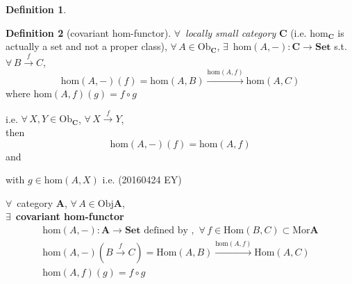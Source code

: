 \documentclass[twoside,landscape,10pt]{amsart}
\theoremstyle{plain}
\theoremstyle{definition}
\newtheorem{definition}{Definition}
\theoremstyle{remark}
\begin{document}
\begin{multicols*}{2}
\begin{definition}


\end{definition}


\begin{definition}[covariant hom-functor]
$\forall \, $ \emph{locally small category} $\mathbf{C}$ (i.e. $\text{hom}_{\mathbf{C}}$ is actually a set and not a proper class), $\forall \, A \in \text{Ob}_{\mathbf{C}}$, $\exists \, $  $\text{hom}(A, - ) : \mathbf{C} \to \mathbf{\text{Set}}$ s.t. $\forall \, B \xrightarrow{f} C$, 
\[
\text{hom}(A,-)(f) = \text{hom}(A,B) \xrightarrow{ \text{hom}(A,f)} \text{hom}(A,C)
\]
where $\text{hom}(A,f)(g) = f\circ g$
\end{definition}

i.e. $\forall \, X,Y \in \text{Ob}_{\mathbf{C}}$, $\forall \, X \xrightarrow{f} Y$,  \\

then 
\[
\text{hom}(A,-)(f) = \text{hom}(A,f)
\]
and
with $g\in \text{hom}(A,X)$ i.e. (20160424 EY)

$\forall \, $ category $\mathbf{A}$, $\forall \, A \in \text{Obj}\mathbf{A}$, \\
$\exists \, $ \textbf{covariant hom-functor }
\[
\begin{gathered}
  \text{hom}(A,-):\mathbf{A} \to \mathbf{\text{Set}} \text{ defined by , }  \, \forall \, f \in \text{Hom}(B,C) \subset \text{Mor}\mathbf{A} \\
  \text{hom}(A,-)(B\xrightarrow{f} C) = \text{Hom}(A,B) \xrightarrow{ \text{hom}(A,f)} \text{Hom}(A,C) \\ 
  \text{hom}(A,f)(g) = f\circ g
\end{gathered}
\]





\end{multicols*}
\end{document}
